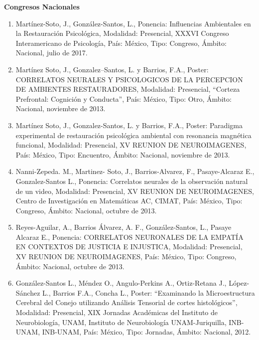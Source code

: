 {\large \textbf{Congresos Nacionales}}

\hrulefill

\begin{enumerate}

\item Martínez-Soto, J., González-Santos, L., Ponencia: Influencias Ambientales en la Restauración 
Psicológica, 
Modalidad: Presencial, XXXVI Congreso Interamericano de Psicología, País: México, Tipo: Congreso, Ámbito: 
Nacional, julio de 2017.

\item Martínez Soto, J., Gonzalez–Santos, L. y Barrios, F.A., Poster: CORRELATOS NEURALES Y PSICOLOGICOS DE LA 
PERCEPCION DE AMBIENTES RESTAURADORES, Modalidad: Presencial, “Corteza Prefrontal: Cognición y Conducta”, 
País: México, Tipo: Otro, Ámbito: Nacional, noviembre de 2013.

\item Martínez Soto, J., Gonzalez-Santos, L. y Barrios, F.A., Poster: Paradigma experimental de restauración 
psicológica ambiental con resonancia magnética funcional, Modalidad: Presencial, XV REUNION DE NEUROIMAGENES, 
País: México, Tipo: Encuentro, Ámbito: Nacional, noviembre de 2013.

\item Nanni-Zepeda. M., Martinez- Soto, J., Barrios-Alvarez, F., Pasaye-Alcaraz E., Gonzalez-Santos L., 
Ponencia: 
Correlatos neurales de la observación natural de un video, Modalidad: Presencial, XV REUNION DE NEUROIMAGENES, 
Centro de Investigación en Matemáticas AC, CIMAT, País: México, Tipo: Congreso, Ámbito: Nacional, octubre de 
2013.

\item Reyes-Aguilar, A., Barrios Álvarez, A. F., González-Santos, L., Pasaye Alcaraz E., Ponencia: CORRELATOS 
NEURONALES DE LA EMPATÍA EN CONTEXTOS DE JUSTICIA E INJUSTICA, Modalidad: Presencial, XV REUNION DE 
NEUROIMAGENES, País: México, Tipo: Congreso, Ámbito: Nacional, octubre de 2013.

\item González-Santos L., Méndez O., Angulo-Perkins A., Ortiz-Retana J., López-Sánchez L., Barrios F.A., 
Concha L., 
Poster: “Examinando la Microestructura Cerebral del Conejo utilizando Análisis Tensorial de cortes 
histológicos”, Modalidad: Presencial, XIX Jornadas Académicas del Instituto de Neurobiología, UNAM, Instituto 
de Neurobiología UNAM-Juriquilla, INB-UNAM, INB-UNAM, País: México, Tipo: Jornadas, Ámbito: Nacional, 2012.


\end{enumerate}

